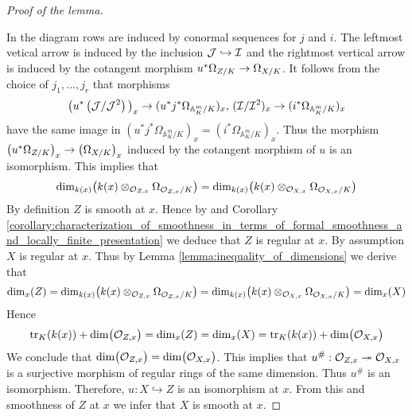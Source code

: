 \begin{proof}[Proof of the lemma]
\begin{center}
\end{center}
In the diagram rows are induced by conormal sequences for $j$ and $i$. The leftmost vetical arrow is induced by the inclusion ${\mathcal J}\hookrightarrow {\mathcal I}$ and the rightmost vertical arrow is induced by the cotangent morphism $u^*\Omega_{Z/K}\rightarrow \Omega_{X/K}$. It follows from the choice of $j_1,...,j_r$ that morphisms
$$\big(u^*\left({\mathcal J}/{\mathcal J}^2\right)\big)_x \rightarrow (u^*j^*\Omega_{\mathbb{A}^m_K / K})_x,\,({\mathcal I}/{\mathcal I}^2)_x \rightarrow (i^*\Omega_{\mathbb{A}^m_K / K})_x$$
have the same image in $(u^*j^*\Omega_{\mathbb{A}^m_K / K})_x = (i^*\Omega_{\mathbb{A}^m_K / K})_x$. Thus the morphism $\left(u^*\Omega_{Z/K}\right)_x \rightarrow \left(\Omega_{X/K}\right)_x$ induced by the cotangent morphism of $u$ is an isomorphism. This implies that
$$\mathrm{dim}_{k(x)}\big(k(x)\otimes_{{\mathcal O}_{Z,x}}\Omega_{{\mathcal O}_{Z,x}/K}\big) = \mathrm{dim}_{k(x)}\big(k(x)\otimes_{{\mathcal O}_{X,x}}\Omega_{{\mathcal O}_{X,x}/K}\big)$$
By definition $Z$ is smooth at $x$. Hence by {\cite[Theorem 6.3]{Formally_smooth_and_unramified}} and Corollary \ref{corollary:characterization_of_smoothness_in_terms_of_formal_smoothness_and_locally_finite_presentation} we deduce that $Z$ is regular at $x$. By assumption $X$ is regular at $x$. Thus by Lemma \ref{lemma:inequality_of_dimensions} we derive that
$$\mathrm{dim}_x(Z) = \mathrm{dim}_{k(x)}\big(k(x)\otimes_{{\mathcal O}_{Z,x}}\Omega_{{\mathcal O}_{Z,x}/K}\big) = \mathrm{dim}_{k(x)}\big(k(x)\otimes_{{\mathcal O}_{X,x}}\Omega_{{\mathcal O}_{X,x}/K}\big) = \mathrm{dim}_x(X)$$
Hence
$$\mathrm{tr}_{K}(k(x)) + \mathrm{dim}\big({\mathcal O}_{Z,x}\big) = \mathrm{dim}_x(Z) = \mathrm{dim}_x(X) = \mathrm{tr}_{K}(k(x)) + \mathrm{dim}\big({\mathcal O}_{X,x}\big)$$
We conclude that $\mathrm{dim}\big({\mathcal O}_{Z,x}\big) = \mathrm{dim}\big({\mathcal O}_{X,x}\big)$. This implies that $u^{\#}:{\mathcal O}_{Z,x}\twoheadrightarrow {\mathcal O}_{X,x}$ is a surjective morphism of regular rings of the same dimension. Thus $u^{\#}$ is an isomorphism. Therefore, $u:X\hookrightarrow Z$ is an isomorphism at $x$. From this and smoothness of $Z$ at $x$ we infer that $X$ is smooth at $x$.
\end{proof}


\small



